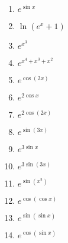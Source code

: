 \documentclass{article}
\begin{document}
\begin{multicols}{3}
\begin{enumerate}
    \item $e^{\sin x}$
    \item $\ln(e^x+1)$
    \item $e^{x^3}$
    \item $e^{x^4+x^3+x^2}$
    \item $e^{\cos(2x)}$
    \item $e^{2\cos x}$
    \item $e^{2\cos(2x)}$
    \item $e^{\sin(3x)}$
    \item $e^{3\sin x}$
    \item $e^{3\sin(3x)}$
    \item $e^{\sin(x^2)}$
    \item $e^{\cos(\cos x)}$
    \item $e^{\sin(\sin x)}$
    \item $e^{\cos(\sin x)}$ %
\end{enumerate}
\end{multicols}
\end{document}
